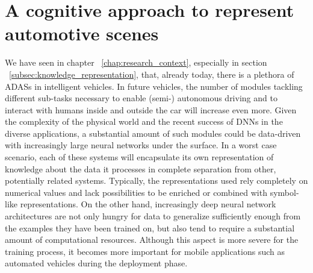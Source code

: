 \chapter{A cognitive approach to represent automotive scenes}%
\label{chap:a_cognitive_approach_to_represent_automotive_scenes}

We have seen in chapter ~\ref{chap:research_context}, especially in section ~\ref{subsec:knowledge_representation}, that, already today, there is a plethora of \acfp{ADAS} in intelligent vehicles. 
In future vehicles, the number of modules tackling different sub-tasks necessary to enable (semi-) autonomous driving and to interact with humans inside and outside the car will increase even more.
Given the complexity of the physical world and the recent success of \acp{DNN} in the diverse applications, a substantial amount of such modules could be data-driven with increasingly large neural networks under the surface.
In a worst case scenario, each of these systems will encapsulate its own representation of knowledge about the data it processes in complete separation from other, potentially related systems.
Typically, the representations used rely completely on numerical values and lack possibilities to be enriched or combined with symbol-like representations.
On the other hand, increasingly deep neural network architectures are not only hungry for data to generalize sufficiently enough from the examples they have been trained on, but also tend to require a substantial amount of computational resources.
Although this aspect is more severe for the training process, it becomes more important for mobile applications such as automated vehicles during the deployment phase.

